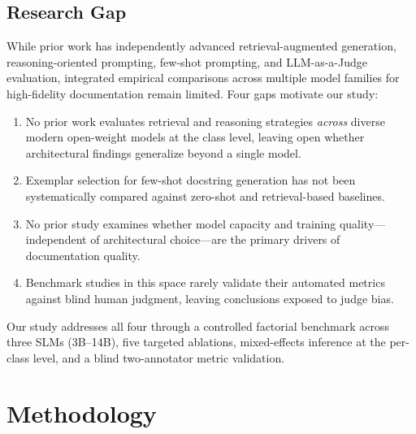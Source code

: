 \documentclass[pdflatex,sn-mathphys-ay]{sn-jnl}%
\theoremstyle{thmstyleone}%
\theoremstyle{thmstyletwo}%
\theoremstyle{thmstylethree}%
\begin{document}
{\color{blue}
\subsection{Research Gap}
While prior work has independently advanced retrieval-augmented generation, reasoning-oriented prompting, few-shot prompting, and LLM-as-a-Judge evaluation, integrated empirical comparisons across multiple model families for high-fidelity documentation remain limited. Four gaps motivate our study:
\begin{enumerate}
  \item No prior work evaluates retrieval and reasoning strategies \emph{across} diverse modern open-weight models at the class level, leaving open whether architectural findings generalize beyond a single model.
  \item Exemplar selection for few-shot docstring generation has not been systematically compared against zero-shot and retrieval-based baselines.
  \item No prior study examines whether model capacity and training quality---independent of architectural choice---are the primary drivers of documentation quality.
  \item Benchmark studies in this space rarely validate their automated metrics against blind human judgment, leaving conclusions exposed to judge bias.
\end{enumerate}
Our study addresses all four through a controlled factorial benchmark across three SLMs (3B--14B), five targeted ablations, mixed-effects inference at the per-class level, and a blind two-annotator metric validation.


}
\section{Methodology}
\label{sec:methodology}
\end{document}
